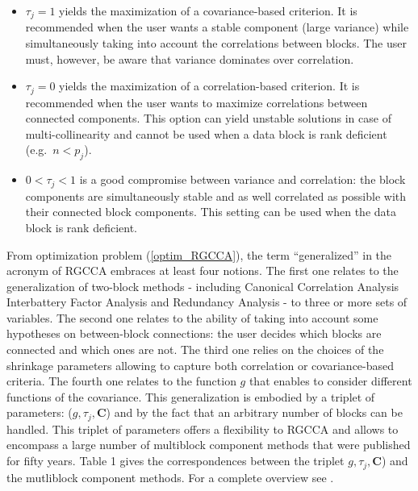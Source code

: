 \documentclass[
]{jss}
\begin{document}
\begin{itemize}
  \begin{itemize}
  \item
    \(\tau_j=1\) yields the maximization of a covariance-based
    criterion. It is recommended when the user wants a stable component
    (large variance) while simultaneously taking into account the
    correlations between blocks. The user must, however, be aware that
    variance dominates over correlation.
  \item
    \(\tau_j=0\) yields the maximization of a correlation-based
    criterion. It is recommended when the user wants to maximize
    correlations between connected components. This option can yield
    unstable solutions in case of multi-collinearity and cannot be used
    when a data block is rank deficient (e.g.~\(n<p_j\)).
  \item
    \(0<\tau_j<1\) is a good compromise between variance and
    correlation: the block components are simultaneously stable and as
    well correlated as possible with their connected block components.
    This setting can be used when the data block is rank deficient.
  \end{itemize}
\end{itemize}

From optimization problem (\ref{optim_RGCCA}), the term ``generalized''
in the acronym of RGCCA embraces at least four notions. The first one
relates to the generalization of two-block methods - including Canonical
Correlation Analysis \citep{Hotelling1936} Interbattery Factor Analysis
\citep{Tucker1958} and Redundancy Analysis \citep{Wollenberg1977} - to
three or more sets of variables. The second one relates to the ability
of taking into account some hypotheses on between-block connections: the
user decides which blocks are connected and which ones are not. The
third one relies on the choices of the shrinkage parameters allowing to
capture both correlation or covariance-based criteria. The fourth one
relates to the function \(g\) that enables to consider different
functions of the covariance. This generalization is embodied by a
triplet of parameters: (\(g, \tau_j, \mathbf C\)) and by the fact that
an arbitrary number of blocks can be handled. This triplet of parameters
offers a flexibility to RGCCA and allows to encompass a large number of
multiblock component methods that were published for fifty years. Table
1 gives the correspondences between the triplet
\(g, \tau_j, \mathbf C\)) and the mutliblock component methods. For a
complete overview see \citep{Tenenhaus2017}.
\end{document}
